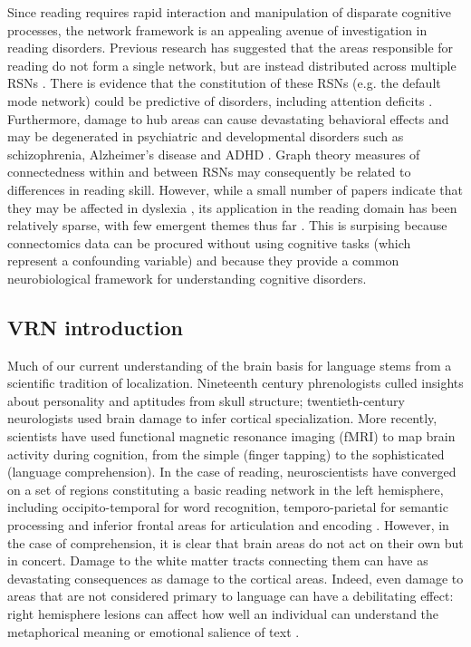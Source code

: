 Since reading requires rapid interaction and manipulation of disparate cognitive processes, the network framework is an appealing avenue of investigation in reading disorders. Previous research has suggested that the areas responsible for reading do not form a single network, but are instead distributed across multiple RSNs \cite{Vogel2013}. There is evidence that the constitution of these RSNs (e.g. the default mode network) could be predictive of disorders, including attention deficits \cite{Uddin2008}. Furthermore, damage to hub areas can cause devastating behavioral effects \cite{Warren2014} and may be degenerated in psychiatric and developmental disorders such as schizophrenia, Alzheimer's disease and ADHD \cite{Stam2014}. Graph theory measures of connectedness within and between RSNs may consequently be related to differences in reading skill. However, while a small number of papers indicate that they may be affected in dyslexia \cite{Qi2016, Finn2014}, its application in the reading domain has been relatively sparse, with few emergent themes thus far \cite{Cao2016}. This is surpising because connectomics data can be procured without using cognitive tasks (which represent a confounding variable) and because they provide a common neurobiological framework for understanding cognitive disorders.





\subsection{VRN introduction}

Much of our current understanding of the brain basis for language stems from a scientific tradition of localization. Nineteenth century phrenologists culled insights about personality and aptitudes from skull structure; twentieth-century neurologists used brain damage to infer cortical specialization. More recently, scientists have used functional magnetic resonance imaging (fMRI) to map brain activity during cognition, from the simple (finger tapping) to the sophisticated (language comprehension). In the case of reading, neuroscientists have converged on a set of regions constituting a basic reading network in the left hemisphere, including occipito-temporal for word recognition, temporo-parietal for semantic processing and inferior frontal areas for articulation and encoding  \cite{Price2012}. However, in the case of comprehension, it is clear that brain areas do not act on their own but in concert. Damage to the white matter tracts connecting them can have as devastating consequences as damage to the cortical areas. Indeed, even damage to areas that are not considered primary to language can have a debilitating effect: right hemisphere lesions can affect how well an individual can understand the metaphorical meaning or emotional salience of text \cite{Ferstl2008, Vigneau2011}.



